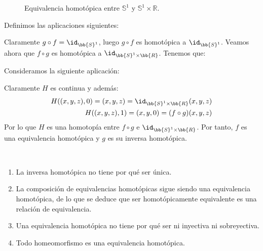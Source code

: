 \begin{ejemplo}
\begin{figure}[ht]
        \caption{Equivalencia homotópica entre $\mathbb{S}^1$ y $\mathbb{S}^1\times \mathbb{R}$.}
        \label{fig:equiv_homotopica}
    \end{figure}

    Definimos las aplicaciones siguientes:

    Claramente $g\circ f = \id_{\bb{S}^1}$, luego $g\circ f$ es homotópica a $\id_{\bb{S}^1}$. Veamos ahora que $f\circ g$ es homotópica a $\id_{\bb{S}^1\times \bb{R}}$. Tenemos que:

    Consideramos la siguiente aplicación:

    Claramente $H$ es continua y además:
    \begin{align*}
        H((x,y,z),0) = (x,y,z) = \id_{\bb{S}^1\times \bb{R}}(x,y,z)\\
        H((x,y,z),1) = (x,y,0) = (f\circ g)(x,y,z)
    \end{align*}
    Por lo que $H$ es una homotopía entre $f\circ g$ e $\id_{\bb{S}^1\times \bb{R}}$. Por tanto, $f$ es una equivalencia homotópica y $g$ es su inversa homotópica.
\end{ejemplo}



\begin{observacion}\
    \begin{enumerate}
        \item La inversa homotópica no tiene por qué ser única.
        \item La composición de equivalencias homotópicas sigue siendo una equivalencia homotópica, de lo que se deduce que ser homotópicamente equivalente es una relación de equivalencia.
        \item Una equivalencia homotópica no tiene por qué ser ni inyectiva ni sobreyectiva. 
        \item Todo homeomorfismo es una equivalencia homotópica.
    \end{enumerate}
\end{observacion}

